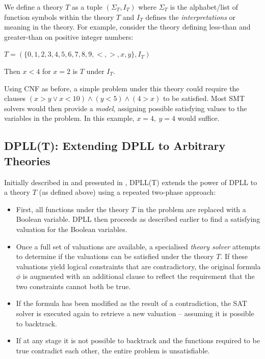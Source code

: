 \documentclass[a4paper,openany,12pt]{book}
\begin{document}
We define a theory $T$ as a tuple $(\Sigma_T, I_T)$ where $\Sigma_T$ is the alphabet/list of function symbols within
the theory $T$ and $I_T$ defines the \emph{interpretations} or meaning in the theory.
For example, consider the theory defining less-than and greater-than on positive integer numbers:

\(
T = (\{0,1,2,3,4,5,6,7,8,9,<,>,x,y\}, I_T)
\)

Then $x < 4$ for $x = 2$ is $T$ under $I_T$.

Using CNF as before, a simple problem under this theory could require the clauses $(x > y \lor x < 10) \land (y < 5)
\land (4 > x)$ to be satisfied.
Most SMT solvers would then provide a \emph{model}, assigning possible satisfying values to the variables in the
problem.
In this example, $x = 4,~y=4$ would suffice.


\subsection{DPLL(T): Extending DPLL to Arbitrary Theories}

Initially described in \citet{ganzinger2004dpll} and presented in \citet{russell2016artificial}, DPLL(T) extends the
power of DPLL to a theory $T$ (as defined above) using a repeated two-phase approach:

\begin{itemize}
    \item First, all functions under the theory $T$ in the problem are replaced with a Boolean variable.
          DPLL then proceeds as described earlier to find a satisfying valuation for the Boolean variables.
    \item Once a full set of valuations are available, a specialised \emph{theory solver} attempts to determine if the
          valuations can be satisfied under the theory $T$.
          If these valuations yield logical constraints that are contradictory, the original formula $\phi$ is augmented
          with an additional clause to reflect the requirement that the two constraints cannot both be true.
    \item If the formula has been modified as the result of a contradiction, the SAT solver is executed again to
          retrieve a new valuation -- assuming it is possible to backtrack.
    \item If at any stage it is not possible to backtrack and the functions required to be true contradict each other,
          the entire problem is unsatisfiable.
\end{itemize}
\end{document}
